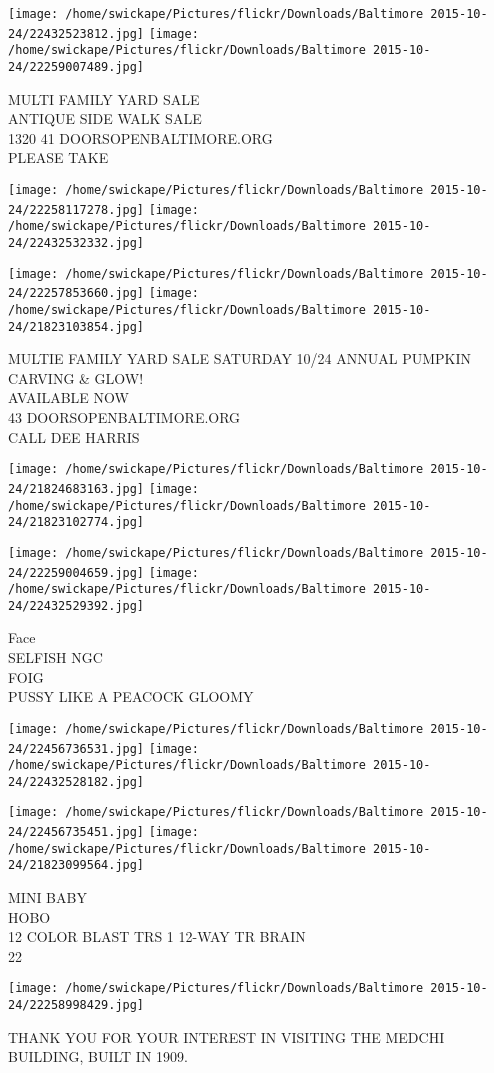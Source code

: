 \documentclass[10pt,letterpaper]{article}
\begin{document}
\texttt{[image: /home/swickape/Pictures/flickr/Downloads/Baltimore 2015-10-24/22432523812.jpg]}
\texttt{[image: /home/swickape/Pictures/flickr/Downloads/Baltimore 2015-10-24/22259007489.jpg]}

MULTI FAMILY YARD SALE\\
ANTIQUE SIDE WALK SALE\\
1320 41 DOORSOPENBALTIMORE.ORG\\
PLEASE TAKE\\
\pagebreak

\texttt{[image: /home/swickape/Pictures/flickr/Downloads/Baltimore 2015-10-24/22258117278.jpg]}
\texttt{[image: /home/swickape/Pictures/flickr/Downloads/Baltimore 2015-10-24/22432532332.jpg]}

\texttt{[image: /home/swickape/Pictures/flickr/Downloads/Baltimore 2015-10-24/22257853660.jpg]}
\texttt{[image: /home/swickape/Pictures/flickr/Downloads/Baltimore 2015-10-24/21823103854.jpg]}

MULTIE FAMILY YARD SALE SATURDAY 10/24 ANNUAL PUMPKIN CARVING \& GLOW!\\
AVAILABLE NOW\\
43 DOORSOPENBALTIMORE.ORG\\
CALL DEE HARRIS\\
\pagebreak

\texttt{[image: /home/swickape/Pictures/flickr/Downloads/Baltimore 2015-10-24/21824683163.jpg]}
\texttt{[image: /home/swickape/Pictures/flickr/Downloads/Baltimore 2015-10-24/21823102774.jpg]}

\texttt{[image: /home/swickape/Pictures/flickr/Downloads/Baltimore 2015-10-24/22259004659.jpg]}
\texttt{[image: /home/swickape/Pictures/flickr/Downloads/Baltimore 2015-10-24/22432529392.jpg]}

Face\\
SELFISH NGC\\
FOIG\\
PUSSY LIKE A PEACOCK GLOOMY\\
\pagebreak

\texttt{[image: /home/swickape/Pictures/flickr/Downloads/Baltimore 2015-10-24/22456736531.jpg]}
\texttt{[image: /home/swickape/Pictures/flickr/Downloads/Baltimore 2015-10-24/22432528182.jpg]}

\texttt{[image: /home/swickape/Pictures/flickr/Downloads/Baltimore 2015-10-24/22456735451.jpg]}
\texttt{[image: /home/swickape/Pictures/flickr/Downloads/Baltimore 2015-10-24/21823099564.jpg]}

MINI BABY\\
HOBO\\
12 COLOR BLAST TRS 1 12{-}WAY TR BRAIN\\
22\\
\pagebreak

\texttt{[image: /home/swickape/Pictures/flickr/Downloads/Baltimore 2015-10-24/22258998429.jpg]}

THANK YOU FOR YOUR INTEREST IN VISITING THE MEDCHI BUILDING, BUILT IN 1909.\\
\pagebreak
\end{document}
